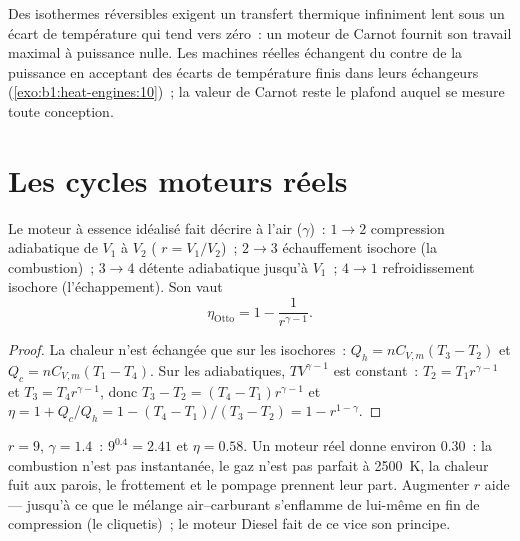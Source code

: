 \begin{remark}\label{rem:b1:heat-engines:notengine}
Des isothermes réversibles exigent un transfert thermique infiniment lent
sous un écart de température qui tend vers zéro~: un moteur de Carnot
fournit son travail maximal à puissance nulle. Les machines réelles
échangent du  contre de la puissance en acceptant des écarts de
température finis dans leurs échangeurs
(\cref{exo:b1:heat-engines:10})~; la valeur de Carnot reste le plafond
auquel se mesure toute conception.
\end{remark}

\section{Les cycles moteurs réels}

\begin{proposition}\label{prop:b1:heat-engines:otto}
Le moteur à essence idéalisé fait décrire à l'air ($\gamma$)~: $1 \to 2$
compression adiabatique de $V_1$ à $V_2$ (\emph{}
$r = V_1/V_2$)~; $2 \to 3$ échauffement isochore (la combustion)~; $3 \to 4$
détente adiabatique jusqu'à $V_1$~; $4 \to 1$ refroidissement isochore
(l'échappement). Son  vaut
\[
\eta_{\text{Otto}} = 1 - \frac{1}{r^{\gamma-1}} .
\]
\end{proposition}

\begin{proof}
La chaleur n'est échangée que sur les isochores~: $Q_h = nC_{V,m}(T_3 - T_2)$ et
$Q_c = nC_{V,m}(T_1 - T_4)$. Sur les adiabatiques, $TV^{\gamma-1}$ est constant~:
$T_2 = T_1r^{\gamma-1}$ et $T_3 = T_4r^{\gamma-1}$, donc $T_3 - T_2 =
(T_4 - T_1)r^{\gamma-1}$ et
$\eta = 1 + Q_c/Q_h = 1 - (T_4 - T_1)/(T_3 - T_2) = 1 - r^{1-\gamma}$.
\end{proof}

\begin{example}\label{ex:b1:heat-engines:ottonumbers}
$r = 9$, $\gamma = 1.4$~: $9^{0.4} = 2.41$ et $\eta = 0.58$. Un moteur réel
donne environ $0.30$~: la combustion n'est pas instantanée, le gaz n'est pas
parfait à \qty{2500}{K}, la chaleur fuit aux parois, le frottement et le
pompage prennent leur part. Augmenter $r$ aide --- jusqu'à ce que le mélange
air--carburant s'enflamme de lui-même en fin de compression (le cliquetis)~;
le moteur Diesel fait de ce vice son principe.
\end{example}

